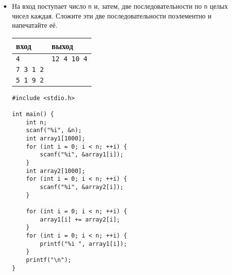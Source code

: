 \documentclass{article}
\begin{document}
\begin{itemize}
\begin{lstlisting}[backgroundcolor = \color{solcolor}]
#include <stdio.h>

int main() {
    int n;
    scanf("%i", &n);
    int array[1000];
    for (int i = 0; i < n; ++i) {
        scanf("%i", &array[i]);
    }
    int k;
    scanf("%i", &k);
    
    for (int i = 0; i < n; ++i) {
        for (int j = 0; j < k; ++j) {
       	    printf("%i ", array[n - 1 - i]);
       	}
    }
    printf("\n");
}
\end{lstlisting}

\item На вход поступает число \texttt{n} и, затем, две последовательности по \texttt{n} целых чисел каждая. Сложите эти две последовательности поэлементно и напечатайте её.
\begin{center}
\begin{tabular}{ l | l }
 вход & выход \\ \hline
 \texttt{4} & \texttt{12 4 10 4}  \\ 
 \texttt{7 3 1 2} &  \\ 
 \texttt{5 1 9 2} &  \\ 
\end{tabular}
\end{center}

\begin{lstlisting}[backgroundcolor = \color{solcolor}]
#include <stdio.h>

int main() {
    int n;
    scanf("%i", &n);
    int array1[1000];
    for (int i = 0; i < n; ++i) {
        scanf("%i", &array1[i]);
    }
    int array2[1000];
    for (int i = 0; i < n; ++i) {
        scanf("%i", &array2[i]);
    }
    
    for (int i = 0; i < n; ++i) {
        array1[i] += array2[i];
    }
    for (int i = 0; i < n; ++i) {
        printf("%i ", array1[i]);
    }
    printf("\n");
}
\end{lstlisting}

\end{itemize}

\newpage
\end{document}
